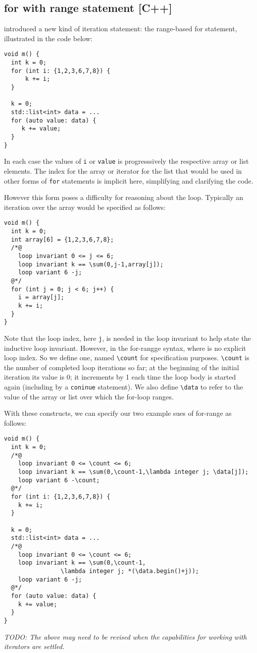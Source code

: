 \subsection{for with range statement [C++]}
\lang{} introduced a new kind of iteration statement: the range-based for statement, illustrated in the code below:
\begin{lstlisting}
void m() {
  int k = 0;
  for (int i: {1,2,3,6,7,8}) {
      k += i;
  }
  
  k = 0;
  std::list<int> data = ...
  for (auto value: data) {
     k += value;
  }
}
\end{lstlisting}

In each case the values of \lstinline|i| or \lstinline|value| is progresssively the respective array or list elements. The  
index for the array or iterator for the list that would be used in other forms of \lstinline|for| statements is implicit here, simplifying and
clarifying the code.

However this form poses a difficulty for reasoning about the loop. Typically an iteration over the array would be specified as follows:
\begin{lstlisting}
void m() {
  int k = 0;
  int array[6] = {1,2,3,6,7,8};
  /*@
    loop invariant 0 <= j <= 6;
    loop invariant k == \sum(0,j-1,array[j]);
    loop variant 6 -j;
  @*/
  for (int j = 0; j < 6; j++) {
    i = array[j];
    k += i;
  }
}
\end{lstlisting}

Note that the loop index, here \lstinline|j|, is needed in the loop invariant to help state the inductive loop invariant. However, in the
for-rangge syntax, where is no explicit loop index. So we define one, named \lstinline|\count| for specification purposes.
\lstinline|\count| is the number of completed loop iterations so far; 
at the beginning of the initial iteration its value is 0; it 
increments by 1 each time the loop body is started again (including by a
\lstinline|coninue| statement).
We also define \lstinline|\data| to refer to the value of the array or list over which the for-loop ranges.

With these constructs, we can specify our two example sues of for-range as follows:
\begin{lstlisting}
void m() {
  int k = 0;
  /*@
    loop invariant 0 <= \count <= 6;
    loop invariant k == \sum(0,\count-1,\lambda integer j; \data[j]);
    loop variant 6 -\count;
  @*/
  for (int i: {1,2,3,6,7,8}) {
    k += i;
  }

  k = 0;
  std::list<int> data = ...
  /*@
    loop invariant 0 <= \count <= 6;
    loop invariant k == \sum(0,\count-1,
                \lambda integer j; *(\data.begin()+j));
    loop variant 6 -j;
  @*/
  for (auto value: data) {
    k += value;
  }
}
\end{lstlisting}

\emph{TODO: The above may need to be revised when the capabilities for working with iterators are settled.}

